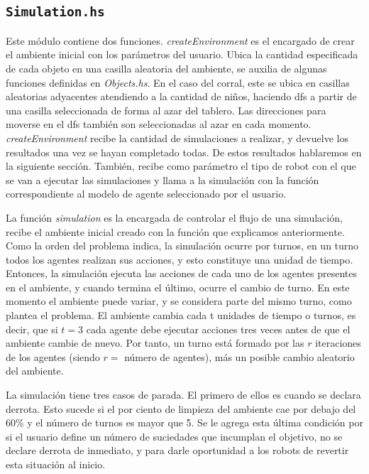 \documentclass[twoside]{article}
\begin{document}
\subsection{\texttt{Simulation.hs}}
Este m\'odulo contiene dos funciones. \textit{createEnvironment} es el encargado de crear el ambiente inicial con los par\'ametros del usuario. Ubica la cantidad especificada de cada objeto en una casilla aleatoria del ambiente, se auxilia de algunas funciones definidas en \textit{Objects.hs}. En el caso del corral, este se ubica en casillas aleatorias adyacentes atendiendo a la cantidad de ni\~nos, haciendo dfs a partir de una casilla seleccionada de forma al azar del tablero. Las direcciones para moverse en el dfs tambi\'en son seleccionadas al azar en cada momento. \textit{createEnvironment} recibe la cantidad de simulaciones a realizar, y devuelve los resultados una vez se hayan completado todas. De estos resultados hablaremos en la siguiente secci\'on. Tambi\'en, recibe como par\'ametro el tipo de robot con el que se van a ejecutar las simulaciones y llama a la simulaci\'on con la funci\'on correspondiente al modelo de agente seleccionado por el usuario.

La funci\'on \textit{simulation} es la encargada de controlar el flujo de una simulaci\'on, recibe el ambiente inicial creado con la funci\'on que explicamos anteriormente. Como la orden del problema indica, la simulaci\'on ocurre por turnos, en un turno todos los agentes realizan sus acciones, y esto constituye una unidad de tiempo. Entonces, la simulaci\'on ejecuta las acciones de cada uno de los agentes presentes en el ambiente, y cuando termina el \'ultimo, ocurre el cambio de turno. En este momento el ambiente puede variar, y se considera parte del mismo turno, como plantea el problema. El ambiente cambia cada t unidades de tiempo o turnos, es decir, que si $t = 3$ cada agente debe ejecutar acciones tres veces antes de que el ambiente cambie de nuevo. Por tanto, un turno est\'a formado por las $r$ iteraciones de los agentes (siendo $r =$ n\'umero de agentes), m\'as un posible cambio aleatorio del ambiente. 

La simulaci\'on tiene tres casos de parada. El primero de ellos es cuando se declara derrota. Esto sucede si el por ciento de limpieza del ambiente cae por debajo del 60\% y el n\'umero de turnos es mayor que 5. Se le agrega esta \'ultima condici\'on por si el usuario define un n\'umero de suciedades que incumplan el objetivo, no se declare derrota de inmediato, y para darle oportunidad a los robots de revertir esta situaci\'on al inicio. 
\end{document}
